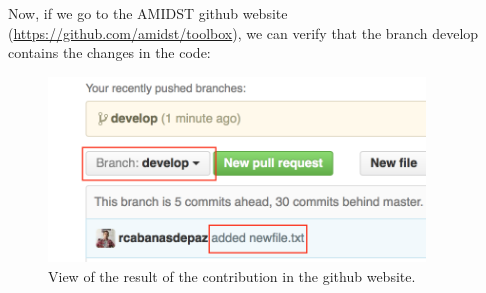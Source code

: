 \documentclass[10pt,a4paper]{article}
\begin{document}
\noindent Now, if we go to the AMIDST github website
(\url{https://github.com/amidst/toolbox}), we can verify that the branch
develop contains the changes in the code:


\begin{figure}[h!]
	\centering
	\includegraphics[width=10cm]{img/merge_result.png}
	\caption{View of the result of the contribution in the github website.}
	\label{fig:merge_result}	
\end{figure}
\end{document}
